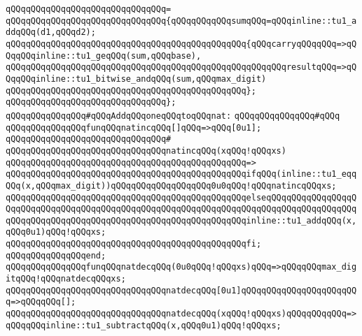 \verb|qQQqqQQqqQQqqQQqqQQqqQQqqQQqqQQq=|\newline
\verb|qQQqqQQqqQQqqQQqqQQqqQQqqQQqqQQq{qQQqqQQqqQQqsumqQQq=qQQqinline::tu1_addqQQq(d1,qQQqd2);|\newline
\newline
\verb|qQQqqQQqqQQqqQQqqQQqqQQqqQQqqQQqqQQqqQQqqQQqqQQq{qQQqcarryqQQqqQQq=>qQQqqQQqinline::tu1_geqQQq(sum,qQQqbase),|\newline
\verb|qQQqqQQqqQQqqQQqqQQqqQQqqQQqqQQqqQQqqQQqqQQqqQQqqQQqqQQqresultqQQq=>qQQqqQQqinline::tu1_bitwise_andqQQq(sum,qQQqmax_digit)|\newline
\verb|qQQqqQQqqQQqqQQqqQQqqQQqqQQqqQQqqQQqqQQqqQQqqQQq};|\newline
\verb|qQQqqQQqqQQqqQQqqQQqqQQqqQQqqQQq};|\newline
\newline
\verb|qQQqqQQqqQQqqQQq#qQQqAddqQQqoneqQQqtoqQQqnat:|\newline
\verb|qQQqqQQqqQQqqQQq#qQQq|\newline
\verb|qQQqqQQqqQQqqQQqfunqQQqnatincqQQq[]qQQq=>qQQq[0u1];|\newline
\verb|qQQqqQQqqQQqqQQqqQQqqQQqqQQqqQQq#|\newline
\verb|qQQqqQQqqQQqqQQqqQQqqQQqqQQqqQQqnatincqQQq(xqQQq!qQQqxs)|\newline
\verb|qQQqqQQqqQQqqQQqqQQqqQQqqQQqqQQqqQQqqQQqqQQqqQQq=>|\newline
\verb|qQQqqQQqqQQqqQQqqQQqqQQqqQQqqQQqqQQqqQQqqQQqqQQqifqQQq(inline::tu1_eqqQQq(x,qQQqmax_digit))qQQqqQQqqQQqqQQqqQQq0u0qQQq!qQQqnatincqQQqxs;|\newline
\verb|qQQqqQQqqQQqqQQqqQQqqQQqqQQqqQQqqQQqqQQqqQQqqQQqelseqQQqqQQqqQQqqQQqqQQqqQQqqQQqqQQqqQQqqQQqqQQqqQQqqQQqqQQqqQQqqQQqqQQqqQQqqQQqqQQqqQQqqQQqqQQqqQQqqQQqqQQqqQQqqQQqqQQqqQQqqQQqqQQqqQQqqQQqinline::tu1_addqQQq(x,qQQq0u1)qQQq!qQQqxs;|\newline
\verb|qQQqqQQqqQQqqQQqqQQqqQQqqQQqqQQqqQQqqQQqqQQqqQQqfi;|\newline
\verb|qQQqqQQqqQQqqQQqend;|\newline
\newline
\verb|qQQqqQQqqQQqqQQqfunqQQqnatdecqQQq(0u0qQQq!qQQqxs)qQQq=>qQQqqQQqmax_digitqQQq!qQQqnatdecqQQqxs;|\newline
\verb|qQQqqQQqqQQqqQQqqQQqqQQqqQQqqQQqnatdecqQQq[0u1]qQQqqQQqqQQqqQQqqQQqqQQq=>qQQqqQQq[];|\newline
\verb|qQQqqQQqqQQqqQQqqQQqqQQqqQQqqQQqnatdecqQQq(xqQQq!qQQqxs)qQQqqQQqqQQq=>qQQqqQQqinline::tu1_subtractqQQq(x,qQQq0u1)qQQq!qQQqxs;|\newline

